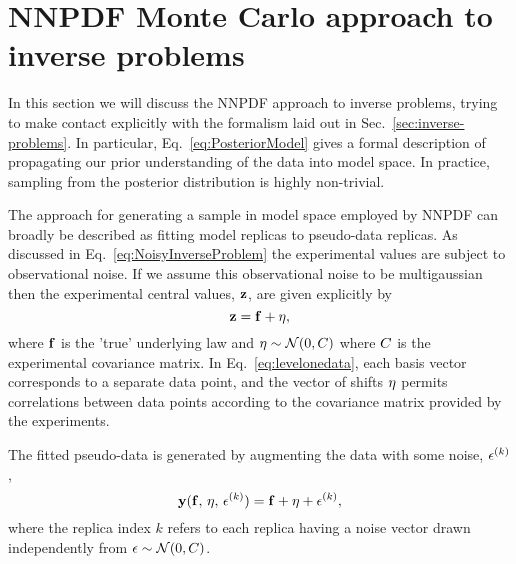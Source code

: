 \section{NNPDF Monte Carlo approach to inverse problems}
\label{sec:closure-test}

In this section we will discuss the NNPDF approach to inverse problems, trying
to make contact explicitly with the formalism laid out in
Sec.~\ref{sec:inverse-problems}. In particular, Eq.~\eqref{eq:PosteriorModel}
gives a formal description of propagating our prior understanding of the data
into model space. In practice, sampling from the posterior distribution is
highly non-trivial.

The approach for generating a sample in model space employed by NNPDF can
broadly be described as fitting model replicas to pseudo-data replicas. As
discussed in Eq.~\eqref{eq:NoisyInverseProblem} the experimental values are
subject to observational noise. If we assume this observational noise to be
multigaussian then the experimental central values, $\mathbf{z}$, are given
explicitly by
\begin{equation}
    \label{eq:levelonedata}
    \mathbf{z} = \mathbf{f} + \mathbf{\eta},
\end{equation}
where $\mathbf{f}$ is the 'true' underlying law and $\mathbf{\eta} \sim
\mathcal{N}(0, C)$ where $C$ is the experimental covariance matrix. In
Eq.~\eqref{eq:levelonedata}, each basis vector corresponds to a separate data
point, and the vector of shifts $\mathbf{\eta}$ permits correlations between data
points according to the covariance matrix provided by the experiments. 

The fitted pseudo-data is generated by augmenting the data with some
noise, $\epsilon^{(k)}$,
\begin{equation}
    \label{eq:leveltwodata1}
    \mathbf{y}(\mathbf{f},\,\mathbf{\eta},\,\mathbf{\epsilon}^{(k)})
    = \mathbf{f} + \mathbf{\eta} + \mathbf{\epsilon}^{(k)},
\end{equation}
where the replica index $k$ refers to each replica having a noise vector drawn
independently from $\mathbf{\epsilon} \sim \mathcal{N}(0, C)$.

